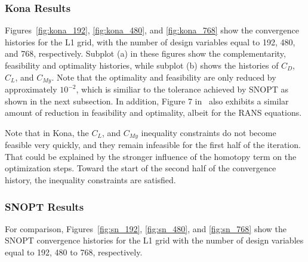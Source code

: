 \subsubsection{Kona Results}
Figures~\ref{fig:kona_192}, \ref{fig:kona_480}, and \ref{fig:kona_768} show the convergence histories for the L1 grid, with the number of 
design variables equal to 192, 480, and 768, respectively. Subplot (a) in these 
figures show the complementarity, feasibility and optimality histories, while subplot (b) shows the histories of $C_D$, $C_L$, and $C_{My}$. Note that the 
optimality and feasibility are only reduced by approximately $10^{-2}$, 
which is similiar to the tolerance achieved by  
SNOPT as shown in the next subsection. In addition, Figure 7 in~\cite{2015lyu_crm} also exhibits a similar amount of 
reduction in feasibility and optimality, albeit for the RANS equations.

Note that in Kona, the $C_L$, and $C_{My}$ inequality constraints do not become feasible 
very quickly, and they remain infeasible for the first half of the iteration. That could be explained by the stronger influence of the homotopy term on the optimization steps. Toward the start of the second half of the convergence history, the inequality constraints are satisfied.   

\subsubsection{SNOPT Results}
For comparison, Figures~\ref{fig:sn_192}, \ref{fig:sn_480}, and \ref{fig:sn_768} show the SNOPT convergence histories  for the L1 grid with the number of 
design variables equal to 192, 480 to 768, respectively. 

